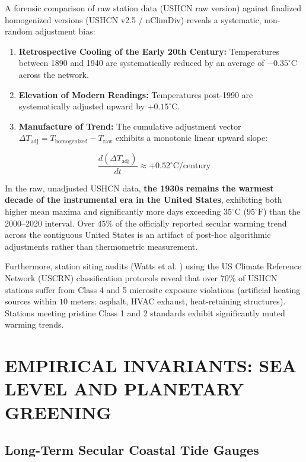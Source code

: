 \documentclass[10pt,twocolumn]{article}
\begin{document}
A forensic comparison of raw station data (USHCN raw version) against finalized homogenized versions (USHCN v2.5 / nClimDiv) reveals a systematic, non-random adjustment bias:

\begin{enumerate}
  \item \textbf{Retrospective Cooling of the Early 20th Century:} Temperatures between 1890 and 1940 are systematically reduced by an average of $-0.35^\circ\text{C}$ across the network.
  \item \textbf{Elevation of Modern Readings:} Temperatures post-1990 are systematically adjusted upward by $+0.15^\circ\text{C}$.
  \item \textbf{Manufacture of Trend:} The cumulative adjustment vector $\Delta T_{\text{adj}} = T_{\text{homogenized}} - T_{\text{raw}}$ exhibits a monotonic linear upward slope:
\end{enumerate}
\begin{equation}
  \frac{d(\Delta T_{\text{adj}})}{dt} \approx +0.52^\circ\text{C} / \text{century}
\end{equation}

In the raw, unadjusted USHCN data, \textbf{the 1930s remains the warmest decade of the instrumental era in the United States}, exhibiting both higher mean maxima and significantly more days exceeding $35^\circ\text{C}$ ($95^\circ\text{F}$) than the 2000–2020 interval. Over $45\%$ of the officially reported secular warming trend across the contiguous United States is an artifact of post-hoc algorithmic adjustments rather than thermometric measurement.

Furthermore, station siting audits (Watts et al. \cite{Watts2015}) using the US Climate Reference Network (USCRN) classification protocols reveal that over $70\%$ of USHCN stations suffer from Class 4 and 5 microsite exposure violations (artificial heating sources within $10\text{ meters}$: asphalt, HVAC exhaust, heat-retaining structures). Stations meeting pristine Class 1 and 2 standards exhibit significantly muted warming trends.



\section{EMPIRICAL INVARIANTS: SEA LEVEL AND PLANETARY GREENING}


\subsection{Long-Term Secular Coastal Tide Gauges}
\end{document}
